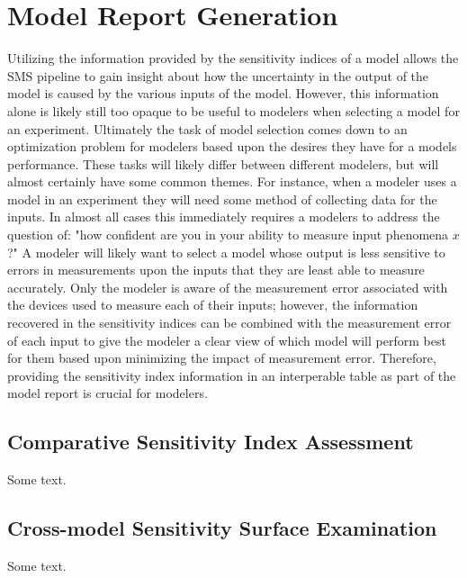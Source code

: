
\section{Model Report Generation\label{sec:report_gen}}
Utilizing the information provided by the sensitivity indices of a model allows the SMS pipeline to gain insight about how the uncertainty in the output of the model is caused by the various inputs of the model.
However, this information alone is likely still too opaque to be useful to modelers when selecting a model for an experiment.
Ultimately the task of model selection comes down to an optimization problem for modelers based upon the desires they have for a models performance.
These tasks will likely differ between different modelers, but will almost certainly have some common themes.
For instance, when a modeler uses a model in an experiment they will need some method of collecting data for the inputs.
In almost all cases this immediately requires a modelers to address the question of: "how confident are you in your ability to measure input phenomena $x$?"
A modeler will likely want to select a model whose output is less sensitive to errors in measurements upon the inputs that they are least able to measure accurately.
Only the modeler is aware of the measurement error associated with the devices used to measure each of their inputs; however, the information recovered in the sensitivity indices can be combined with the measurement error of each input to give the modeler a clear view of which model will perform best for them based upon minimizing the impact of measurement error.
Therefore, providing the sensitivity index information in an interperable table as part of the model report is crucial for modelers.

\subsection{Comparative Sensitivity Index Assessment\label{sec:comp_sens_ind}}
Some text.

\subsection{Cross-model Sensitivity Surface Examination \label{sec:multi_mod_surface}}
Some text.
